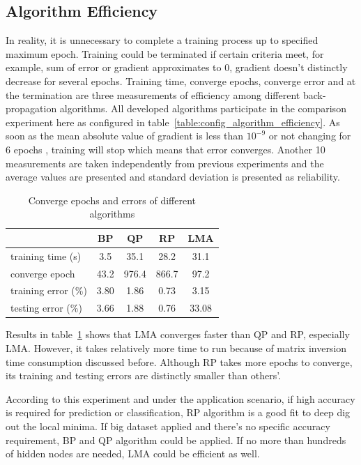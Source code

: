 \documentclass[procedia]{easychair}
\begin{document}
\subsection{Algorithm Efficiency}

In reality, it is unnecessary to complete a training process up to specified maximum epoch.  Training could be terminated if certain criteria meet, for example, sum of error or gradient approximates to 0, gradient doesn’t distinctly decrease for several epochs.  Training time, converge epochs, converge error and at the termination are three measurements of efficiency among different back-propagation algorithms.  All developed algorithms participate in the comparison experiment here as configured in table~\ref{table:config_algorithm_efficiency}.  As soon as the mean absolute value of gradient is less than $10 ^ {-9}$ or not changing for 6 epochs \cite{matlab:neural_networks}, training will stop which means that error converges.  Another 10 measurements are taken independently from previous experiments and the average values are presented and standard deviation is presented as reliability.

\begin{table}[htp]
    \centering
    \caption{Converge epochs and errors of different algorithms}
    \begin{tabular}{ l c c c c }
        \hline \hline
        & BP & QP & RP & LMA \\
        \hline
        training time (s) & 3.5 & 35.1 & 28.2 & 31.1 \\
        converge epoch & 43.2 & 976.4 & 866.7 & 97.2 \\
        training error (\%) & 3.80 & 1.86 & 0.73 & 3.15 \\
        testing error (\%) & 3.66 & 1.88 & 0.76 & 33.08 \\
        \hline \hline
    \end{tabular}
    \label{table:algorithm_efficiency}
\end{table}

Results in table~\ref{table:algorithm_efficiency} shows that LMA converges faster than QP and RP, especially LMA.  However, it takes relatively more time to run because of matrix inversion time consumption discussed before.  Although RP takes more epochs to converge, its training and testing errors are distinctly smaller than others’.

According to this experiment and under the application scenario, if high accuracy is required for prediction or classification, RP algorithm is a good fit to deep dig out the local minima.  If big dataset applied and there’s no specific accuracy requirement, BP and QP algorithm could be applied.  If no more than hundreds of hidden nodes are needed, LMA could be efficient as well.
\end{document}
